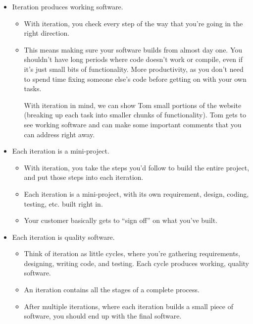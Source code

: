 \documentclass[letterpaper]{article}
\begin{document}
\begin{itemize}
    \item Iteration produces working software. 
    \begin{itemize}
        \item With iteration, you check every step of the way that you're going in the right direction. 
        \item This means making sure your software builds from almost day one. You shouldn't have long periods where code doesn't work or compile, even if it's just small bits of functionality. More productivity, as you don't need to spend time fixing someone else's code before getting on with your own tasks. 
        \begin{mdframed}
            With iteration in mind, we can show Tom small portions of the website (breaking up each task into smaller chunks of functionality). Tom gets to see working software and can make some important comments that you can address right away. 
        \end{mdframed}
    \end{itemize}

    \item Each iteration is a mini-project.
    \begin{itemize}
        \item With iteration, you take the steps you'd follow to build the entire project, and put those steps into each iteration. 
        \item Each iteration is a mini-project, with its own requirement, design, coding, testing, etc. built right in. 
        \item Your customer basically gets to ``sign off'' on what you've built. 
    \end{itemize}

    \item Each iteration is quality software.
    \begin{itemize}
        \item Think of iteration as little cycles, where you're gathering requirements, designing, writing code, and testing. Each cycle produces working, quality software. 
        \item An iteration contains all the stages of a complete process. 
        \item After multiple iterations, where each iteration builds a small piece of software, you should end up with the final software. 
    \end{itemize}


\end{itemize}
\end{document}
